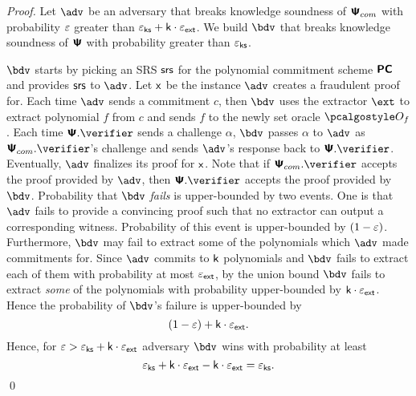 \documentclass[runningheads,11pt]{llncs}
\begin{document}
\begin{proof}
  Let $\adv$ be an adversary that breaks knowledge soundness of $\bm{\mathsf{\Psi}}_{com}$ with
  probability $\varepsilon$ greater than $\varepsilon_{\mathsf{ks}} + \mathsf{k} \cdot \varepsilon_{\mathsf{ext}}$. We build
  $\bdv$ that breaks knowledge soundness of $\bm{\mathsf{\Psi}}$ with probability greater than
  $\varepsilon_{\mathsf{ks}}$.

  $\bdv$ starts by picking an SRS $\mathsf{srs}$ for the polynomial commitment scheme
  $\bm{\mathsf{PC}}$ and provides $\mathsf{srs}$ to $\adv$. Let $\mathsf{x}$ be the instance $\adv$
  creates a fraudulent proof for. Each time $\adv$ sends a commitment $c$, then
  $\bdv$ uses the extractor $\ext$ to extract polynomial $f$ from $c$ and sends
  $f$ to the newly set oracle $\oracleo_f$.    Each time $\PS.\verifier$ sends a
  challenge $\alpha$, $\bdv$ passes $\alpha$ to $\adv$ as $\PSc.\verifier$'s
  challenge and sends $\adv$'s response back to $\PS.\verifier$. Eventually,
  $\adv$ finalizes its proof for $\mathsf{x}$. Note that if $\PSc.\verifier$ accepts
  the proof provided by $\adv$, then $\PS.\verifier$ accepts the proof provided
  by $\bdv$. Probability that $\bdv$ \emph{fails} is upper-bounded by two
  events. One is that $\adv$ fails to provide a convincing proof such that no
  extractor can output a corresponding witness. Probability of this event is
  upper-bounded by $(1 - \varepsilon)$. Furthermore, $\bdv$ may fail to extract some
  of the polynomials which $\adv$ made commitments for. Since $\adv$ commits to
  $\mathsf{k}$ polynomials and $\bdv$ fails to extract each of them with probability
  at most $\varepsilon_{\mathsf{ext}}$, by the union bound $\bdv$ fails to extract \emph{some} of
  the polynomials with probability upper-bounded by $\mathsf{k} \cdot
  \varepsilon_{\mathsf{ext}}$. Hence the probability of $\bdv$'s failure is upper-bounded by
  \[
    (1 - \varepsilon) + \mathsf{k} \cdot \varepsilon_{\mathsf{ext}}.
  \]
  Hence, for $\varepsilon > \varepsilon_{\mathsf{ks}} + \mathsf{k} \cdot \varepsilon_{\mathsf{ext}}$ adversary $\bdv$ wins with probability at least
  \[
    \varepsilon_{\mathsf{ks}} + \mathsf{k} \cdot \varepsilon_{\mathsf{ext}} - \mathsf{k} \cdot \varepsilon_{\mathsf{ext}}  = \varepsilon_{\mathsf{ks}}.
  \]
  \qed
\end{proof}




\end{document}
